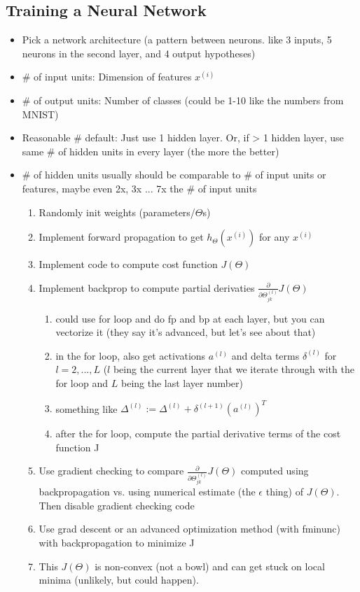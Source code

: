 \documentclass[]{article}
\begin{document}
	\subsection{Training a Neural Network}
		\begin{itemize}
			\item Pick a network architecture (a pattern between neurons. like 3 inputs, 5 neurons in the second layer, and 4 output hypotheses)
			\item \# of input units: Dimension of features $x^{(i)}$
			\item \# of output units: Number of classes (could be 1-10 like the numbers from MNIST)
			\item Reasonable \# default: Just use 1 hidden layer. Or, if > 1 hidden layer, use same \# of hidden units in every layer (the more the better)
			\item \# of hidden units usually should be comparable to \# of input units or features, maybe even 2x, 3x ... 7x the \# of input units
			
			\begin{enumerate}
				\item Randomly init weights (parameters/$\Theta$s)
				\item Implement forward propagation to get $h_\Theta(x^{(i)})$ for any $x^{(i)}$
				\item Implement code to compute cost function $J(\Theta)$
				\item Implement backprop to compute partial derivaties $\frac{\partial}{\partial \Theta_{jk}^{(l)}}J(\Theta)$
				
				\begin{enumerate}		
					\item could use for loop and do fp and bp at each layer, but you can vectorize it (they say it's advanced, but let's see about that)
					\item in the for loop, also get activations $a^{(l)}$ and delta terms $\delta^{(l)}$ for $l=2,...,L$ ($l$ being the current layer that we iterate through with the for loop and $L$ being the last layer number)
					\item something like $\Delta^{(l)}:=\Delta^{(l)} + \delta^{(l+1)}(a^{(l)})^T$
					\item after the for loop, compute the partial derivative terms of the cost function J
				\end{enumerate}
				
			\item Use gradient checking to compare $\frac{\partial}{\partial \Theta_{jk}^{(l)}}J(\Theta)$ computed using backpropagation vs. using numerical estimate (the $\epsilon$ thing) of $J(\Theta)$.
			\\Then disable gradient checking code
			\item Use grad descent or an advanced optimization method (with fminunc) with backpropagation to minimize J
			\item This $J(\Theta)$ is non-convex (not a bowl) and can get stuck on local minima (unlikely, but could happen).
			
			\end{enumerate}
			
		\end{itemize}
		
\end{document}
